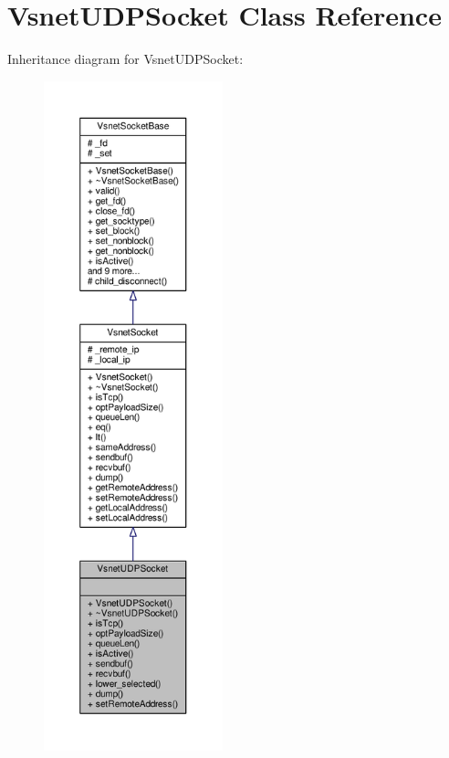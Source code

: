 \hypertarget{classVsnetUDPSocket}{}\section{Vsnet\+U\+D\+P\+Socket Class Reference}
\label{classVsnetUDPSocket}


Inheritance diagram for Vsnet\+U\+D\+P\+Socket\+:
\nopagebreak
\begin{figure}[H]
\begin{center}
\leavevmode
\includegraphics[height=550pt]{d6/dec/classVsnetUDPSocket__inherit__graph}
\end{center}
\end{figure}


